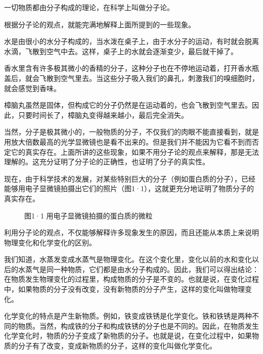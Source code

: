 一切物质都由分子构成的理论，在科学上叫做分子论。

根据分子论的观点，就能完满地解释上面所提到的一些现象。

水是由很小的水分子构成的，当水泼在桌子上，由于水分子的运动，有时就会脱离水滴，飞散到空气中去。这样，桌子上的水就会逐渐变少，最后就干掉了。

香水里含有许多极其微小的香精的分子，这种分子也在不停地运动着，打开香水瓶盖后，就会飞散到空气里去。当这些分子吸入我们的鼻孔，刺激我们的嗅细胞时，就会感觉到香味。

樟脑丸虽然是固体，但构成它的分子仍然是在运动着的，也会飞散到空气里去。因此，只要时间长了，樟脑丸变得越来越小，最后完全消失。

当然，分子是极其微小的，一般物质的分子，不仅我们的肉眼不能直接看到，就是用放大倍数最高的光学显微镜也是看不出来的。但是我们并不能因为它看不到而否定它的真实存在。上面所讲的这些现象，如果不用分子论的观点来解释，那是无法理解的。这充分证明了分子论的正确性，也证明了分子的真实性。

现在，由于科学技术的发展，对某些特别巨大的分子（例如蛋白质的分子），已经能够用电子显微镜拍摄出它们的照片（图1·1），这就更充分地证明了物质分子的真实存在。

\begin{figure}
\centering
\caption{图1·1 用电子显微镜拍摄的蛋白质的微粒}
\end{figure}

利用分子论的观点，不仅能够解释许多现象发生的原因，而且还能从本质上来说明物理变化和化学变化的区别。

我们知道，水蒸发变成水蒸气是物理变化。在这个变化里，变化以前的水和变化以后的水蒸气是同一种物质，它们都是由水分子构成的。因此，我们可以得出结论：在物质发生物理变化的过程里，构成物质的分子是不变的。也就是说，在变化过程中，如果物质的分子没有改变，没有新物质的分子产生，这样的变化叫做物理变化。

化学变化的特点是产生新物质。例如，铁变成铁锈是化学变化。铁和铁锈是两种不同的物质。当然，构成铁的分子和构成铁锈的分子也是不同的。因此，在物质发生化学变化时，物质的分子变成了新物质的分子。也就是说，在变化过程中，如果物质的分子有了改变，变成新物质的分子，这样的变化叫做化学变化。


